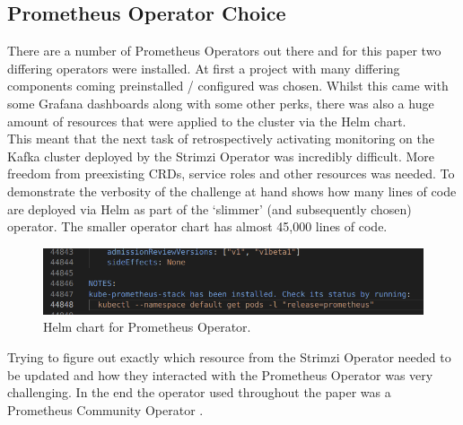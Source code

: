 \subsection{Prometheus Operator Choice}
There are a number of Prometheus Operators out there and for this paper two differing operators were installed.
At first a project with many differing components coming preinstalled / configured was chosen. Whilst this came with some Grafana dashboards
along with some other perks, there was also a huge amount of resources that were applied to the cluster via the Helm chart. \\
This meant that the next task of retrospectively activating monitoring on the Kafka cluster deployed by the Strimzi Operator was incredibly difficult.
More freedom from preexisting CRDs, service roles and other resources was needed. To demonstrate the verbosity of the challenge at hand
 shows how many lines of code are deployed via Helm as part of the `slimmer' (and subsequently chosen) operator. The smaller
operator chart has almost 45,000 lines of code.
\begin{figure}[H]
	\centering
	\includegraphics[width=1\linewidth]{figures/helm_get_all_prom.png}
	\caption{Helm chart for Prometheus Operator.}
	\label{fig:helm_get_prom}
\end{figure}
Trying to figure out exactly which resource from the Strimzi Operator needed to be updated and how they interacted with the Prometheus Operator
was very challenging. In the end the operator used throughout the paper was a Prometheus Community Operator \autocite{Kubeprometheusstack34Prometheus}.
